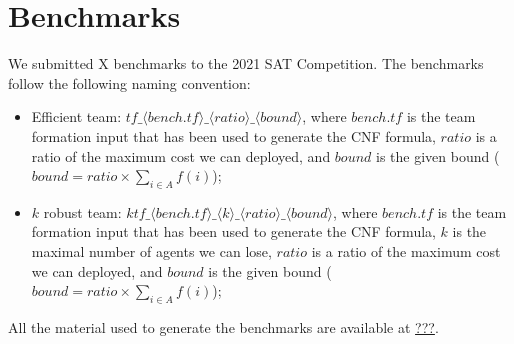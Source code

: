 \documentclass[conference]{IEEEtran}
\theoremstyle{definition}
\begin{document}
\section{Benchmarks}

We submitted X benchmarks to the 2021 SAT Competition.
The benchmarks follow the following naming convention:
\begin{itemize}
\item Efficient team: $tf\_\langle bench.tf \rangle \_\langle ratio \rangle\_\langle bound \rangle$, 
where $bench.tf$ is the team formation input that has been used to generate the CNF formula,
$ratio$ is a ratio of the maximum cost we can deployed, and $bound$ is the given bound 
($bound = ratio \times \sum_{i \in A} f(i)$);
\item $k$ robust team: $ktf\_\langle bench.tf \rangle \_\langle k \rangle\_\langle ratio \rangle\_\langle bound \rangle$, where $bench.tf$ is the team formation input that has been used to generate the CNF formula,
$k$ is the maximal number of agents we can lose,
$ratio$ is a ratio of the maximum cost we can deployed, and $bound$ is the given bound 
($bound = ratio \times \sum_{i \in A} f(i)$);
\end{itemize}

All the material used to generate the benchmarks are available at \url{???}.


 

\end{document}
